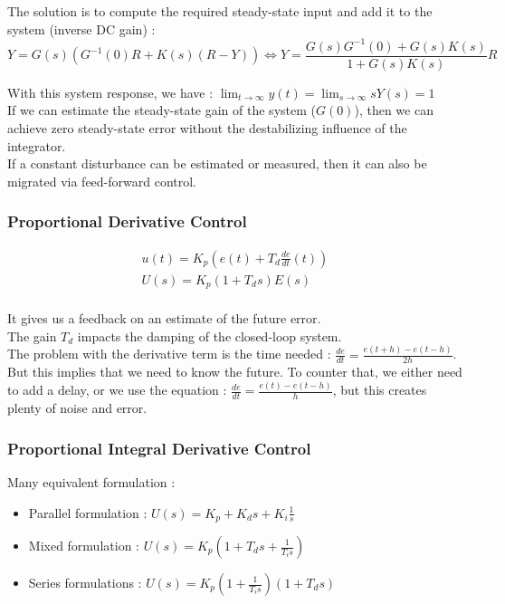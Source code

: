 \documentclass[../main.tex]{subfiles}
\begin{document}
The solution is to compute the required steady-state input and add it to the system (inverse DC gain) : \begin{equation}
    Y = G(s)(G^{-1}(0)R+K(s)(R-Y)) \Leftrightarrow Y = \frac{G(s) G^{-1}(0) + G(s)K(s)}{1+G(s)K(s)} R
\end{equation}

With this system response, we have : $\lim_{t\rightarrow \infty} y(t) = \lim_{s\rightarrow \infty} sY(s) = 1$\\

If we can estimate the steady-state gain of the system ($G(0)$), then we can achieve zero steady-state error without the destabilizing influence of the integrator.\\

If a constant disturbance can be estimated or measured, then it can also be migrated via feed-forward control.\\




\subsubsection{Proportional Derivative Control}
\begin{equation}
    \begin{gathered}
        u(t) = K_p(e(t) + T_d \frac{de}{dt}(t)) \\
        U(s) = K_p (1+T_ds) E(s)\\
    \end{gathered}
\end{equation}

It gives us a feedback on an estimate of the future error.\\

The gain $T_d$ impacts the damping of the closed-loop system.\\

The problem with the derivative term is the time needed : $\frac{de}{dt} = \frac{e(t+h)-e(t-h)}{2h}$. But this implies that we need to know the future. To counter that, we either need to add a delay, or we use the equation : $\frac{de}{dt}= \frac{e(t)-e(t-h)}{h}$, but this creates plenty of noise and error.\\

\subsubsection{Proportional Integral Derivative Control}
Many equivalent formulation : \begin{itemize}
    \item Parallel formulation : $U(s) = K_p + K_ds+K_i\frac{1}{s}$\\
    \item Mixed formulation : $U(s) = K_p (1+T_ds+ \frac{1}{T_i s})$\\
    \item Series formulations : $U(s) = K_p(1+\frac{1}{T_is})(1+T_ds)$\\
\end{itemize}
\end{document}
